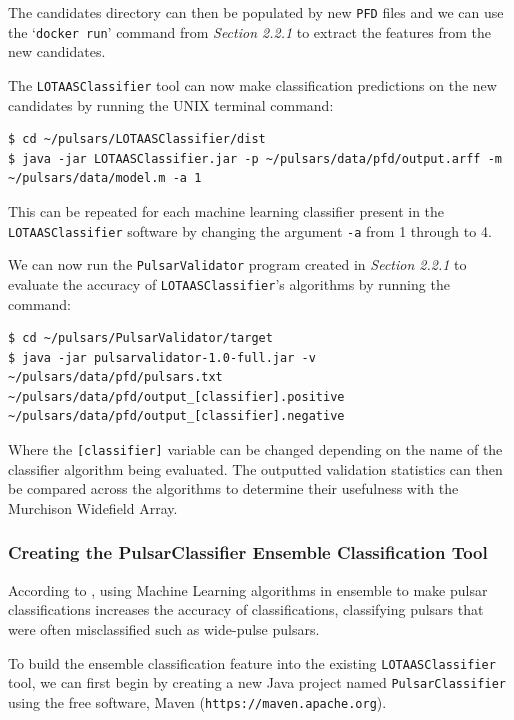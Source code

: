 \documentclass{article}
\begin{document}
The candidates directory can then be populated by new \verb|PFD| files and we can use the `\verb|docker run|' command from \emph{Section 2.2.1} to extract the features from the new candidates.

The \verb|LOTAASClassifier| tool can now make classification predictions on the new candidates by running the UNIX terminal command:

\begin{lstlisting}[numbers=none]
$ cd ~/pulsars/LOTAASClassifier/dist
$ java -jar LOTAASClassifier.jar -p ~/pulsars/data/pfd/output.arff -m ~/pulsars/data/model.m -a 1
\end{lstlisting}

This can be repeated for each machine learning classifier present in the \verb|LOTAASClassifier| software by changing the argument \verb|-a| from 1 through to 4.

We can now run the \verb|PulsarValidator| program created in \emph{Section 2.2.1} to evaluate the accuracy of \verb|LOTAASClassifier|'s algorithms by running the command:

\begin{lstlisting}[numbers=none]
$ cd ~/pulsars/PulsarValidator/target
$ java -jar pulsarvalidator-1.0-full.jar -v ~/pulsars/data/pfd/pulsars.txt ~/pulsars/data/pfd/output_[classifier].positive ~/pulsars/data/pfd/output_[classifier].negative
\end{lstlisting}

Where the \verb|[classifier]| variable can be changed depending on the name of the classifier algorithm being evaluated. The outputted validation statistics can then be compared across the algorithms to determine their usefulness with the Murchison Widefield Array.

\subsubsection{Creating the PulsarClassifier Ensemble Classification Tool}

According to \cite{tan}, using Machine Learning algorithms in ensemble to make pulsar classifications increases the accuracy of classifications, classifying pulsars that were often misclassified such as wide-pulse pulsars.

To build the ensemble classification feature into the existing \verb|LOTAASClassifier| tool, we can first begin by creating a new Java project named \verb|PulsarClassifier| using the free software, Maven (\verb|https://maven.apache.org|).
\end{document}
